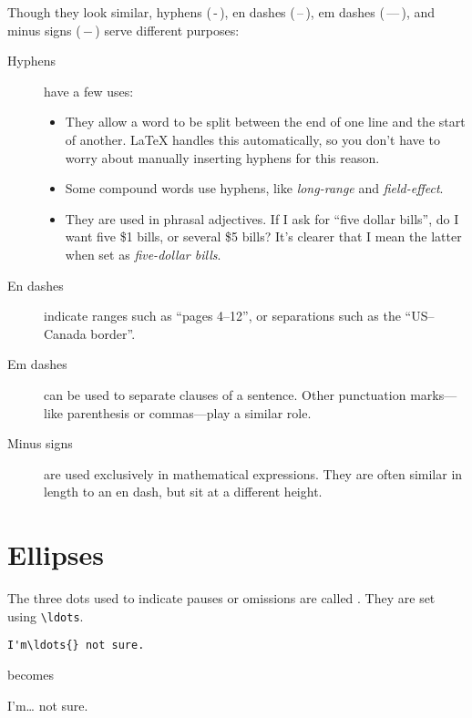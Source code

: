 Though they look similar,
hyphens (\,-\,), en dashes (\,--\,),
em dashes (\,---\,), and minus signs (\,$-$\,)
serve different purposes:
\begin{description}
\item[Hyphens] have a few uses:
    \begin{itemize}[leftmargin=*]
    \item They allow a word to be split between the end of one line and the
        start of another.
        \LaTeX{} handles this automatically,
        so you don't have to worry about manually inserting hyphens for this
        reason.
    \item Some compound words use hyphens, like \emph{long-range}
        and \emph{field-effect}.
    \item They are used in phrasal adjectives.
        If I ask for ``five dollar bills''\punckern,
        do I want five \$1 bills, or several \$5 bills?
        It's clearer that I mean the latter when set as
        \emph{five-dollar bills}.
    \end{itemize}

\item[En dashes] indicate ranges such as ``pages 4--12''\quotekern,
    or separations such as the ``US--Canada border''\quotekern.

\item[Em dashes] can be used to separate clauses of a sentence.
    Other punctuation marks---like parenthesis or commas---play a similar
    role.

\item[Minus signs] are used exclusively in mathematical expressions.
    They are often similar in length to an en dash,
    but sit at a different height.
\end{description}

\section{Ellipses}

The three dots used to indicate pauses or omissions are called
.
They are set using \verb|\ldots|.
\begin{leftfigure}
\begin{lstlisting}
I'm\ldots{} not sure.
\end{lstlisting}
\end{leftfigure}
becomes
\begin{leftfigure}
\lm%
I'm\ldots{} not sure.
\end{leftfigure}

